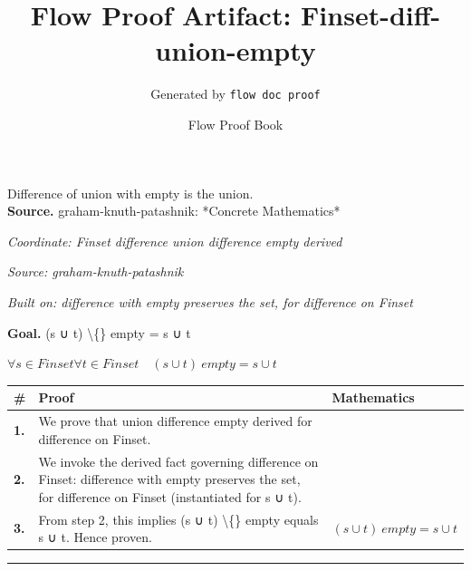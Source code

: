 \documentclass[11pt]{article}
\title{Flow Proof Artifact: Finset-diff-union-empty}
\author{Generated by \texttt{flow doc proof}}
\date{Flow Proof Book}
\theoremstyle{definition}
\begin{document}
\maketitle
Difference of union with empty is the union.\\[0.5em]
\textbf{Source.} graham-knuth-patashnik: *Concrete Mathematics*\\[0.5em]
\bigskip
{}\par
\smallskip\noindent\textit{Coordinate: Finset \cdot difference \cdot union difference empty derived}\par
\smallskip\noindent\textit{Source: graham-knuth-patashnik}\par
\smallskip\noindent\textit{Built on: difference with empty preserves the set, for difference on Finset}\par
\medskip
\noindent\textbf{Goal.} (s ∪ t) \textbackslash\{\} empty = s ∪ t\par
\noindent$\displaystyle \forall s \in Finset \forall t \in Finset\quad (s ∪ t) \ empty = s ∪ t$\par
\medskip
\noindent
\begin{tabular}{@{} >{\raggedright\arraybackslash}p{} >{\raggedright\arraybackslash}p{} >{\raggedleft\arraybackslash}p{} @{}}
\textbf{\#} & \textbf{Proof} & \textbf{Mathematics} \\
\midrule
\textbf{1.} & We prove that union difference empty derived for difference on Finset. & \\[0.45em]
\textbf{2.} & We invoke the derived fact governing difference on Finset: difference with empty preserves the set, for difference on Finset (instantiated for s ∪ t). & \\[0.45em]
\textbf{3.} & From step 2, this implies (s ∪ t) \textbackslash\{\} empty equals s ∪ t. Hence proven. & $\displaystyle (s ∪ t) \ empty = s ∪ t$ \\[0.45em]
\bottomrule
\end{tabular}
\label{thm:Finset-difference-union_difference_empty_derived}
\par\medskip\hrule
\end{document}
